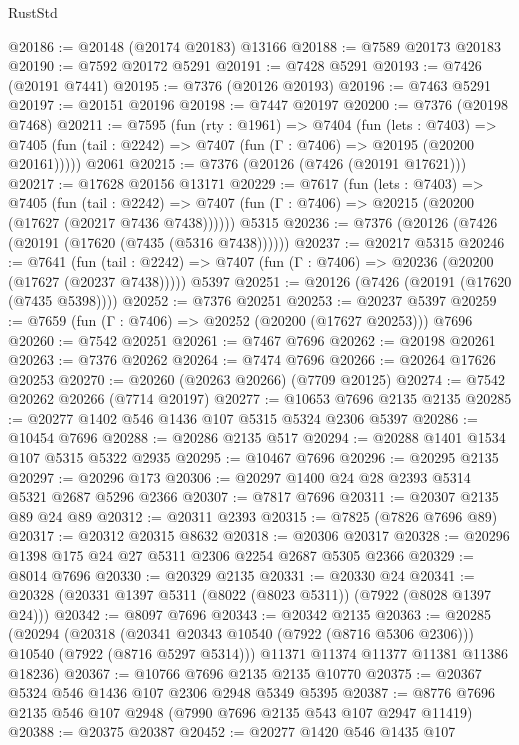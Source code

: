 \begin{lexlean}{RustStd}
\begin{coremodule}
@20186 := @20148 (@20174 @20183) @13166
@20188 := @7589 @20173 @20183
@20190 := @7592 @20172 @5291
@20191 := @7428 @5291
@20193 := @7426 (@20191 @7441)
@20195 := @7376 (@20126 @20193)
@20196 := @7463 @5291
@20197 := @20151 @20196
@20198 := @7447 @20197
@20200 := @7376 (@20198 @7468)
@20211 := @7595
    (fun (rty : @1961) =>
    @7404
      (fun (lets : @7403) =>
      @7405 (fun (tail : @2242) => @7407 (fun (Γ : @7406) => @20195 (@20200 @20161)))))
    @2061
@20215 := @7376 (@20126 (@7426 (@20191 @17621)))
@20217 := @17628 @20156 @13171
@20229 := @7617
    (fun (lets : @7403) =>
    @7405
      (fun (tail : @2242) =>
      @7407 (fun (Γ : @7406) => @20215 (@20200 (@17627 (@20217 @7436 @7438))))))
    @5315
@20236 := @7376 (@20126 (@7426 (@20191 (@17620 (@7435 (@5316 @7438))))))
@20237 := @20217 @5315
@20246 := @7641
    (fun (tail : @2242) => @7407 (fun (Γ : @7406) => @20236 (@20200 (@17627 (@20237 @7438)))))
    @5397
@20251 := @20126 (@7426 (@20191 (@17620 (@7435 @5398))))
@20252 := @7376 @20251
@20253 := @20237 @5397
@20259 := @7659 (fun (Γ : @7406) => @20252 (@20200 (@17627 @20253))) @7696
@20260 := @7542 @20251
@20261 := @7467 @7696
@20262 := @20198 @20261
@20263 := @7376 @20262
@20264 := @7474 @7696
@20266 := @20264 @17626 @20253
@20270 := @20260 (@20263 @20266) (@7709 @20125)
@20274 := @7542 @20262 @20266 (@7714 @20197)
@20277 := @10653 @7696 @2135 @2135
@20285 := @20277 @1402 @546 @1436 @107 @5315 @5324 @2306 @5397
@20286 := @10454 @7696
@20288 := @20286 @2135 @517
@20294 := @20288 @1401 @1534 @107 @5315 @5322 @2935
@20295 := @10467 @7696
@20296 := @20295 @2135
@20297 := @20296 @173
@20306 := @20297 @1400 @24 @28 @2393 @5314 @5321 @2687 @5296 @2366
@20307 := @7817 @7696
@20311 := @20307 @2135 @89 @24 @89
@20312 := @20311 @2393
@20315 := @7825 (@7826 @7696 @89)
@20317 := @20312 @20315 @8632
@20318 := @20306 @20317
@20328 := @20296 @1398 @175 @24 @27 @5311 @2306 @2254 @2687 @5305 @2366
@20329 := @8014 @7696
@20330 := @20329 @2135
@20331 := @20330 @24
@20341 := @20328 (@20331 @1397 @5311 (@8022 (@8023 @5311)) (@7922 (@8028 @1397 @24)))
@20342 := @8097 @7696
@20343 := @20342 @2135
@20363 := @20285
    (@20294
      (@20318 (@20341 @20343 @10540 (@7922 (@8716 @5306 @2306))) @10540 (@7922 (@8716 @5297 @5314)))
      @11371
      @11374
      @11377
      @11381
      @11386
      @18236)
@20367 := @10766 @7696 @2135 @2135 @10770
@20375 := @20367 @5324 @546 @1436 @107 @2306 @2948 @5349 @5395
@20387 := @8776 @7696 @2135 @546 @107 @2948 (@7990 @7696 @2135 @543 @107 @2947 @11419)
@20388 := @20375 @20387
@20452 := @20277
    @1420
    @546
    @1435
    @107

\end{coremodule}
\end{lexlean}

